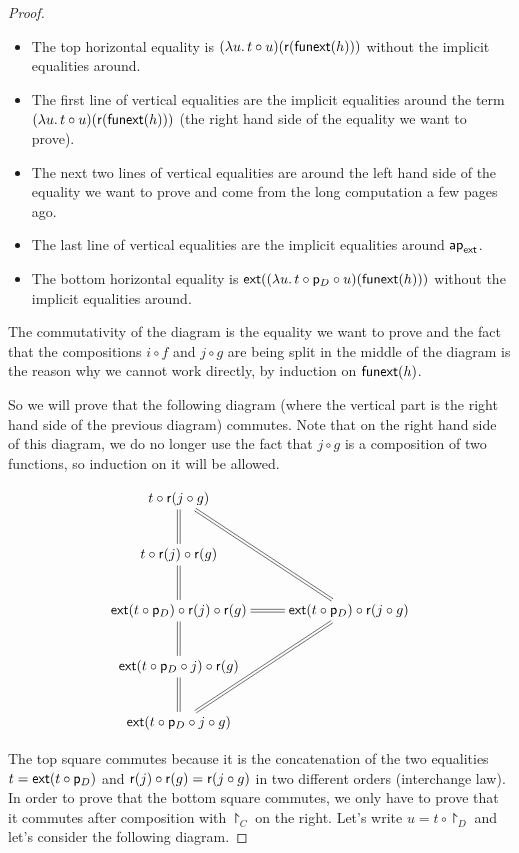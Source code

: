 \begin{proof}
  \begin{itemize}
  \item The top horizontal equality is
    ${(\lambda{}u.\,t\circ{}u)}({{\mathsf{r}}({\mathsf{funext}(h)})})$ without the
    implicit equalities around.
  \item The first line of vertical equalities are the implicit equalities around
    the term ${(\lambda{}u.\,t\circ{}u)}({{\mathsf{r}}({\mathsf{funext}(h)})})$ (the
    right hand side of the equality we want to prove).
  \item The next two lines of vertical equalities are around the left hand side
    of the equality we want to prove and come from the long computation a few
    pages ago.
  \item The last line of vertical equalities are the implicit equalities around
    $\mathsf{ap}_{\mathsf{ext}}$.
  \item The bottom horizontal equality is
    ${\mathsf{ext}}({{(\lambda{}u.\,t\circ\mathsf{p}_D\circ{}u)}({\mathsf{funext}(h)})})$
    without the implicit equalities around.
  \end{itemize}

  The commutativity of the diagram is the equality we want to prove and
  the fact that the compositions $i\circ f$ and $j\circ g$ are being split in
  the middle of the diagram is the reason why we cannot work directly, by induction on
  $\mathsf{funext}(h)$.

  So we will prove that the following diagram (where the vertical part is the
  right hand side of the previous diagram) commutes. Note that on the right hand
  side of this diagram, we do no longer use the fact that $j\circ g$ is a
  composition of two functions, so induction on it will be allowed.

  \[\xymatrix{
    t\circ\reflect(j\circ g) \ar@{=}[d] & \\
    t\circ\reflect(j)\circ\reflect(g) \ar@{=}[d] & \\
    \extend{t\circ\project_D}\circ\reflect(j)\circ\reflect(g) \ar@{=}[d] &
    \extend{t\circ\project_D}\circ\reflect(j\circ g) \ar@{=}[l] \ar@{=}[luu]
    \ar@{=}[ldd] \\
    \extend{t\circ\project_D\circ j}\circ\reflect(g) \ar@{=}[d] & \\
    \extend{t\circ\project_D\circ j\circ g} & \\
  }\]

  The top square commutes because it is the concatenation of the two equalities
  $t=\mathsf{ext}(t\circ\mathsf{p}_D)$ and $\mathsf{r}(j)\circ\mathsf{r}(g)=\mathsf{r}(j\circ
  g)$ in two different orders (interchange law). In order to prove that the
  bottom square commutes, we only have to prove that it commutes after
  composition with $\project_C$ on the right. Let's write $u=t\circ\project_D$
  and let's consider the following diagram.


\end{proof}
